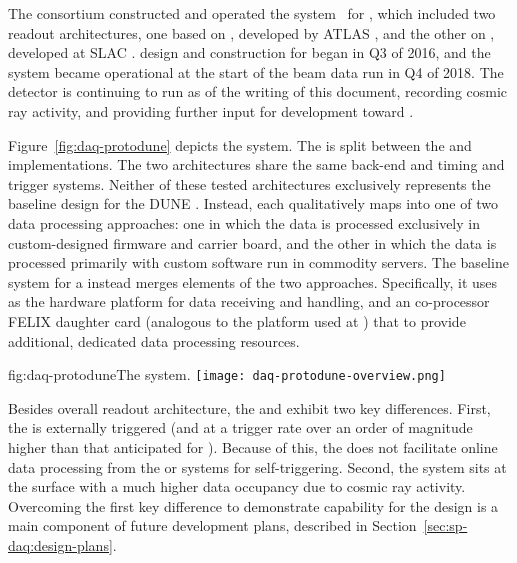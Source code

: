 The   consortium constructed and operated the  system~\cite{Sipos:2018auh} for , which included two  readout architectures, one based on , developed by ATLAS \cite{atlas-felix}, and the other on , developed at SLAC \cite{daq-slac-rce}.  design and construction for  began in Q3 of 2016, and the system became operational at the start of the beam data run in Q4 of 2018. The detector is continuing to run as of the writing of this document, recording cosmic ray activity, and providing further input for  development toward . 

Figure~\ref{fig:daq-protodune} depicts the   system. 
The  is split between the  and  implementations. The two architectures share the same back-end and timing and trigger systems. 
Neither of these tested architectures exclusively represents the baseline design for the DUNE . Instead, each qualitatively maps into one of two data processing approaches: one in which the data is processed exclusively in custom-designed  firmware and carrier board, and the other in which the data is processed primarily with custom software run in commodity servers.
The baseline system for a  instead merges elements of the two approaches.
Specifically, it uses  as the hardware platform for data receiving and handling, and an co-processor FELIX daughter card (analogous to the  platform used at ) that to provide additional, dedicated data processing resources.


\begin{dunefigure}{fig:daq-protodune}{The   system.}
  \texttt{[image: daq-protodune-overview.png]}
\end{dunefigure}

Besides overall readout architecture, the  and   exhibit two key differences. 
First, the   is externally triggered (and at a trigger rate over an order of magnitude higher than that anticipated for ). Because of this, the   does not facilitate online data processing from the  or  systems for self-triggering. 
Second, the  system sits at the surface with a much higher data occupancy due to cosmic ray activity.
Overcoming the first key difference to demonstrate  capability for the   design is a main component of future  development plans, described in Section~\ref{sec:sp-daq:design-plans}.

